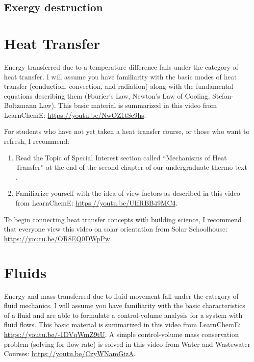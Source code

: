 \documentclass[10pt]{article}
\begin{document}
\subsection{Exergy destruction}

\section{Heat Transfer}

Energy transferred due to a temperature difference falls under the category of heat transfer. I will assume you have familiarity with the basic modes of heat transfer (conduction, convection, and radiation) along with the fundamental equations describing them (Fourier's Law, Newton's Law of Cooling, Stefan-Boltzmann Law). This basic material is summarized in this video from LearnChemE: \url{https://youtu.be/NwOZ1tSe9hs}.

For students who have not yet taken a heat transfer course, or those who want to refresh, I recommend:

\begin{enumerate}

\item Read the Topic of Special Interest section called ``Mechanisms of Heat Transfer'' at the end of the second chapter of our undergraduate thermo text \cite{cengel}. 
\item Familiarize yourself with the idea of view factors as described in this video from LearnChemE: \url{https://youtu.be/UIfRBB49MC4}.

\end{enumerate}

To begin connecting heat transfer concepts with building science, I recommend that everyone view this video on solar orientation from Solar Schoolhouse: \url{https://youtu.be/OR8EQ0DWpPw}.

\section{Fluids}

Energy and mass transferred due to fluid movement fall under the category of fluid mechanics. I will assume you have familiarity with the basic characteristics of a fluid and are able to formulate a control-volume analysis for a system with fluid flows. This basic material is summarized in this video from LearnChemE: \url{https://youtu.be/-1DVqWmZ9tU}. A simple  control-volume mass conservation problem (solving for flow rate) is solved in this video from 
Water and Wastewater Courses: \url{https://youtu.be/CzyWNamGizA}.
\end{document}
